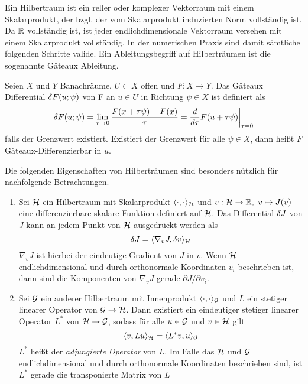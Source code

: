 Ein Hilbertraum ist ein reller oder komplexer Vektorraum mit einem Skalarprodukt, der bzgl. der vom Skalarprodukt induzierten Norm vollständig ist. Da $\mathbb{R}$ vollständig ist, ist jeder endlichdimensionale Vektorraum versehen mit einem Skalarprodukt vollständig. In der numerischen Praxis sind damit sämtliche folgenden Schritte valide. 
Ein Ableitungsbegriff auf Hilberträumen ist die sogenannte Gâteaux Ableitung.
\begin{definition}
 Seien $X$ und $Y$ Banachräume, $U \subset X$ offen und $F:X\to Y$. Das Gâteaux Differential $\delta F(u;\psi)$ von F an $u\in U$ in Richtung $\psi\in X$ ist definiert als
 \[
  \delta F(u;\psi) = \lim_{\tau \to 0} \frac{F(x+\tau \psi) - F(x)}{\tau} = \frac{d}{d\tau} F(u+\tau\psi)\biggr\rvert_{\tau = 0}
 \]
 falls der Grenzwert existiert. Existiert der Grenzwert für alle $\psi\in X$, dann heißt $F$ Gâteaux-Differenzierbar in $u$.
\end{definition}
Die folgenden Eigenschaften von Hilberträumen sind besonders nützlich für nachfolgende Betrachtungen.
\begin{proposition}
\label{prop:adjoints}
\begin{enumerate}
 \item Sei $\mathcal{H}$ ein Hilbertraum mit Skalarprodukt $\langle \cdot,\cdot \rangle_{\mathcal{H}}$ und $v:\mathcal{H} \to \mathbb{R},~ v\mapsto J(v)$ eine differenzierbare skalare Funktion definiert auf $\mathcal{H}$. Das Differential $\delta J$ von $J$ kann an jedem Punkt von $\mathcal{H}$ ausgedrückt werden als
 \begin{equation}
 \label{eq:diffInnerProduct}
  \delta J = \langle \nabla_v J, \delta v\rangle_{\mathcal{H}}
 \end{equation}
 $\nabla_v J$ ist hierbei der eindeutige Gradient von $J$ in $v$. Wenn $\mathcal{H}$ endlichdimensional und durch orthonormale Koordinaten $v_i$ beschrieben ist, dann sind die Komponenten von $\nabla_v J$ gerade $\partial J/\partial v_i$.
\item Sei $\mathcal{G}$ ein anderer Hilbertraum mit Innenprodukt $\langle \cdot,\cdot \rangle_{\mathcal{G}}$ und $L$ ein stetiger linearer Operator von $\mathcal{G}\to \mathcal{H}$. Dann existiert ein eindeutiger stetiger linearer Operator $L^*$ von $\mathcal{H}\to\mathcal{G}$, sodass für alle $u\in \mathcal{G}$ und $v\in \mathcal{H}$ gilt
\begin{equation}
\label{eq:adjointInnerProduct}
\langle v,Lu\rangle_{\mathcal{H}} =  \langle L^*v,u \rangle_{\mathcal{G}}
\end{equation}
$L^*$ heißt der \textit{adjungierte Operator} von $L$. Im Falle das $\mathcal{H}$ und $\mathcal{G}$ endlichdimensional und durch orthonormale Koordinaten beschrieben sind, ist $L^*$ gerade die transponierte Matrix von $L$
\end{enumerate} 
\end{proposition}

